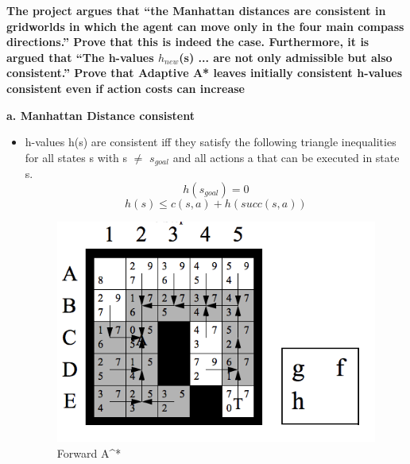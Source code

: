 \documentclass[a4 paper]{article}
\begin{document}
\newpage
{}

\textbf{\hspace{-16pt}The project argues that “the Manhattan distances are consistent in
gridworlds in which the agent can move only in the four main compass directions.” Prove that this is indeed the case.
Furthermore, it is argued that “The h-values $h_{new}$(s) ... are not only admissible but also consistent.” Prove that Adaptive A*
leaves initially consistent h-values consistent even if action costs can increase}


\textbf{\hspace{-15pt}a. Manhattan Distance consistent}
\begin{itemize}
    
    \item h-values h(s) are consistent iff they satisfy the following triangle inequalities for all states s with s $\neq$ $s_{goal}$ and all actions a that can be executed in state s. \\
    \begin{equation}
    h(s_{goal}) = 0
    \end{equation}
    \begin{equation}
    h(s) \leq c(s, a) + h(succ(s, a))
    \label{eqn:forward}
    \end{equation}
    
    
    \begin{figure}[!htbp]
        \centering
        \includegraphics[scale=0.9]{Q4 pic.png}
        \caption{Forward A^*}
        \label{Forward A^*}
    \end{figure}
    

\end{itemize}
\end{document}
